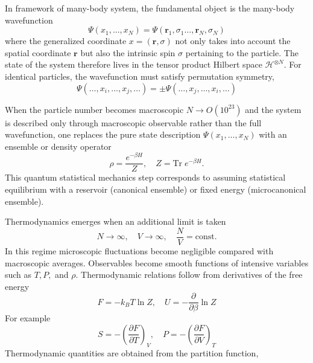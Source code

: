 \documentclass[../../../main.tex]{subfiles}
\begin{document}
In framework of many-body system, the fundamental object is the many-body wavefunction
\[
  \Psi(x_1,\ldots,x_N)
  =\Psi(\mathbf{r}_1,\sigma_1\dots,\mathbf{r}_N,\sigma_N)
\]
where the generalized coordinate $x = (\mathbf{r}, \sigma)$ not only takes into account the spatial coordinate $\mathbf{r}$ but also the intrinsic spin $\sigma$ pertaining to the particle.
The state of the system therefore lives in the tensor product Hilbert space $\mathcal{H}^{\otimes N}$.
For identical particles, the wavefunction must satisfy permutation symmetry,
\begin{equation*}
  \Psi(\ldots, x_i, \ldots, x_j, \ldots) = \pm \Psi(\ldots, x_j, \ldots, x_i, \ldots)
\end{equation*}

When the particle number becomes macroscopic $  N \rightarrow O(10^{23})$ and the system is described only through macroscopic observable rather than the full wavefunction, one replaces the pure state description $\Psi(x_1,\ldots,x_N)$ with an ensemble or density operator
\begin{equation*}
  \rho = \frac{e^{-\beta H}}{Z}, \quad Z = \text{Tr} \; e^{-\beta H}.
\end{equation*}
This quantum statistical mechanics step corresponds to assuming statistical equilibrium with a reservoir (canonical ensemble) or fixed energy (microcanonical ensemble).

Thermodynamics emerges when an additional limit is taken
\begin{equation*}
  N \to \infty, \quad V \to \infty, \quad \frac{N}{V} = \text{const.}
\end{equation*}
In this regime microscopic fluctuations become negligible compared with macroscopic averages.
Observables become smooth functions of intensive variables such as \(T, P,\) and \(\rho\).
Thermodynamic relations follow from derivatives of the free energy
\begin{equation*}
  F = -k_B T \ln Z, \quad U = -\frac{\partial}{\partial \beta} \ln Z
\end{equation*}
For example
\begin{equation*}
  S = -\left( \frac{\partial F}{\partial T} \right)_V, \quad P = -\left( \frac{\partial F}{\partial V} \right)_T
\end{equation*}
Thermodynamic quantities are obtained from the partition function,
\end{document}
